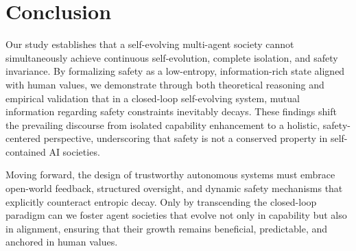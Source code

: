 \documentclass{article}
\theoremstyle{definition}
\theoremstyle{plain}
\begin{document}
\section{Conclusion}
Our study establishes that a self-evolving multi-agent society cannot simultaneously achieve continuous self-evolution, complete isolation, and safety invariance. By formalizing safety as a low-entropy, information-rich state aligned with human values, we demonstrate through both theoretical reasoning and empirical validation that in a closed-loop self-evolving system, mutual information regarding safety constraints inevitably decays. 
These findings shift the prevailing discourse from isolated capability enhancement to a holistic, safety-centered perspective, underscoring that safety is not a conserved property in self-contained AI societies. 

Moving forward, the design of trustworthy autonomous systems must embrace open-world feedback, structured oversight, and dynamic safety mechanisms that explicitly counteract entropic decay. Only by transcending the closed-loop paradigm can we foster agent societies that evolve not only in capability but also in alignment, ensuring that their growth remains beneficial, predictable, and anchored in human values.


  
  
\end{document}
